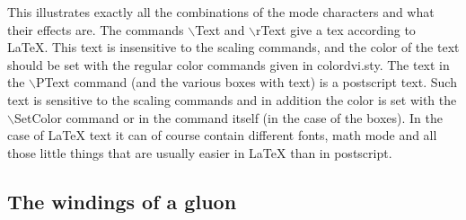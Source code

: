 This illustrates exactly all the combinations of the mode characters and 
what their effects are. The commands $\backslash$Text and 
$\backslash$rText give a tex according to \LaTeX{}. This text is 
insensitive to the scaling commands, and the color of the text should be 
set with the regular color commands given in colordvi.sty. The text in the 
$\backslash$PText command (and the various boxes with text) is a postscript 
text. Such text is sensitive to the scaling commands and in addition the 
color is set with the $\backslash$SetColor command or in the command itself 
(in the case of the boxes). In the case of \LaTeX{} text 
it can of course contain different fonts, 
math mode and all those little things that are usually easier in 
\LaTeX{} than in postscript.

\subsection{The windings of a gluon}

